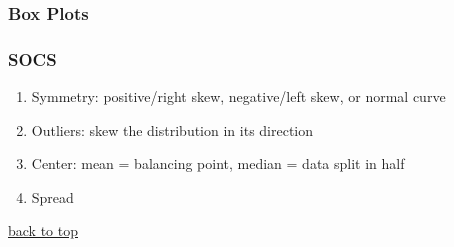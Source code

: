 \documentclass[12pt]{article}
\numberwithin{equation}{section}
\begin{document}
\subsubsection{Box Plots}
\subsubsection{SOCS}
\begin{enumerate}
    \item Symmetry: positive/right skew, negative/left skew, or normal curve
    \item Outliers: skew the distribution in its direction
    \item Center: mean = balancing point, median = data split in half
    \item Spread
\end{enumerate}

\noindent \begin{flushright} \hyperref[sec:top]{back to top} \end{flushright}
\end{document}

